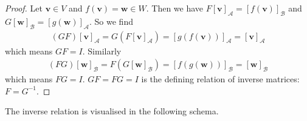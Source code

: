 \begin{proof}
Let $\mathbf{v}\in V$ and $f(\mathbf{v}) = \mathbf{w} \in W$. Then we have $F[\mathbf{v}]_\mathcal{A} = [f(\mathbf{v})]_\mathcal{B}$ and $G[\mathbf{w}]_\mathcal{B} = [g(\mathbf{w})]_\mathcal{A}$. So we find
\begin{align*}
\left(GF\right)[\mathbf{v}]_\mathcal{A} = G\left(F[\mathbf{v}]_\mathcal{A}\right) = [g(f(\mathbf{v}))]_\mathcal{A} = [\mathbf{v}]_\mathcal{A}
\end{align*}
which means $GF = I$. Similarly
\begin{align*}
\left(FG\right)[\mathbf{w}]_\mathcal{B} = F\left(G[\mathbf{w}]_\mathcal{B}\right) = [f(g(\mathbf{w}))]_\mathcal{B} = [\mathbf{w}]_\mathcal{B}
\end{align*}
which means $FG = I$. $GF = FG = I$ is the defining relation of inverse matrices: $F = G^{-1}$.
\end{proof}
\noindent The inverse relation is visualised in the following schema.

